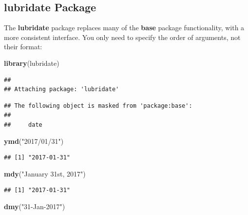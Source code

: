 \documentclass[]{book}
\newenvironment{Shaded}{\begin{snugshade}}{\end{snugshade}}
\newcommand{\KeywordTok}[1]{\textcolor[rgb]{0.13,0.29,0.53}{\textbf{#1}}}
\newcommand{\NormalTok}[1]{#1}
\newcommand{\StringTok}[1]{\textcolor[rgb]{0.31,0.60,0.02}{#1}}
\theoremstyle{definition}
\theoremstyle{definition}
\theoremstyle{definition}
\theoremstyle{remark}
\begin{document}
\hypertarget{lubridate-package}{%
\subsection{lubridate Package}\label{lubridate-package}}

The \textbf{lubridate} package replaces many of the \textbf{base} package functionality, with a more consistent interface.
You only need to specify the order of arguments, not their format:

\begin{Shaded}
\begin{Highlighting}[]
\KeywordTok{library}\NormalTok{(lubridate)}
\end{Highlighting}
\end{Shaded}

\begin{verbatim}
## 
## Attaching package: 'lubridate'
\end{verbatim}

\begin{verbatim}
## The following object is masked from 'package:base':
## 
##     date
\end{verbatim}

\begin{Shaded}
\begin{Highlighting}[]
\KeywordTok{ymd}\NormalTok{(}\StringTok{"2017/01/31"}\NormalTok{)}
\end{Highlighting}
\end{Shaded}

\begin{verbatim}
## [1] "2017-01-31"
\end{verbatim}

\begin{Shaded}
\begin{Highlighting}[]
\KeywordTok{mdy}\NormalTok{(}\StringTok{"January 31st, 2017"}\NormalTok{)}
\end{Highlighting}
\end{Shaded}

\begin{verbatim}
## [1] "2017-01-31"
\end{verbatim}

\begin{Shaded}
\begin{Highlighting}[]
\KeywordTok{dmy}\NormalTok{(}\StringTok{"31-Jan-2017"}\NormalTok{)}
\end{Highlighting}
\end{Shaded}
\end{document}
